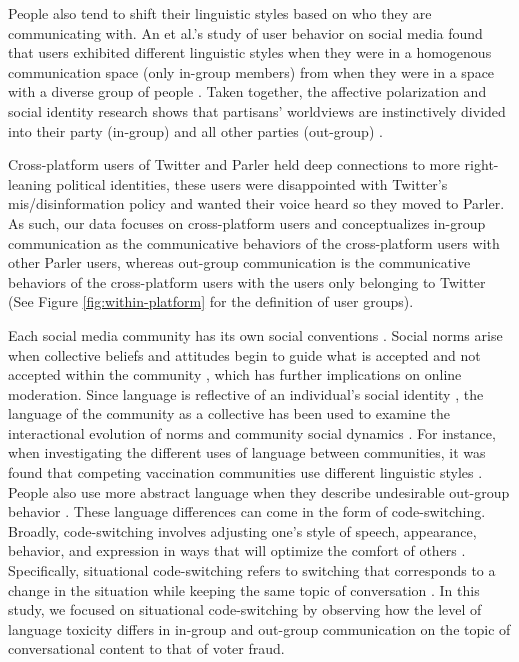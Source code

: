 \documentclass[Crown,sagev,times]{sagej}
\begin{document}
People also tend to shift their linguistic styles based on who they are communicating with. An et al.'s study of user behavior on social media found that users exhibited different linguistic styles when they were in a homogenous communication space (only in-group members) from when they were in a space with a diverse group of people \cite{an2019political}. 
Taken together, the affective polarization and social identity research shows that partisans' worldviews are instinctively divided into their party (in-group) and all other parties (out-group) \cite{tajfel1979integrative}. 

Cross-platform users of Twitter and Parler held deep connections to more right-leaning political identities, these users were disappointed with Twitter's mis/disinformation policy and wanted their voice heard so they moved to Parler. As such, our data focuses on cross-platform users and conceptualizes in-group communication as the communicative behaviors of the cross-platform users with other Parler users, whereas out-group communication is the communicative behaviors of the cross-platform users with the users only belonging to Twitter (See Figure \ref{fig:within-platform} for the definition of user groups). 

Each social media community has its own social conventions \cite{kooti2012predicting}. Social norms arise when collective beliefs and attitudes begin to guide what is accepted and not accepted within the community \cite{opp2001norms}, which has further implications on online moderation. Since language is reflective of an individual's social identity \cite{tong1999language}, the language of the community as a collective has been used to examine the interactional evolution of norms and community social dynamics \cite{danescu2013no}. For instance, when investigating the different uses of language between communities, it was found that competing vaccination communities use different linguistic styles \cite{memon2020characterizing}. People also use more abstract language when they describe undesirable out-group behavior \cite{maass1989language}. 
These language differences can come in the form of code-switching. Broadly, code-switching involves adjusting one's style of speech, appearance, behavior, and expression in ways that will optimize the comfort of others \cite{mccluney2019code}. Specifically, situational code-switching refers to switching that corresponds to a change in the situation while keeping the same topic of conversation \cite{hudson_1996}. 
In this study, we focused on situational code-switching by observing how the level of language toxicity differs in in-group and out-group communication on the topic of conversational content to that of voter fraud.
\end{document}
